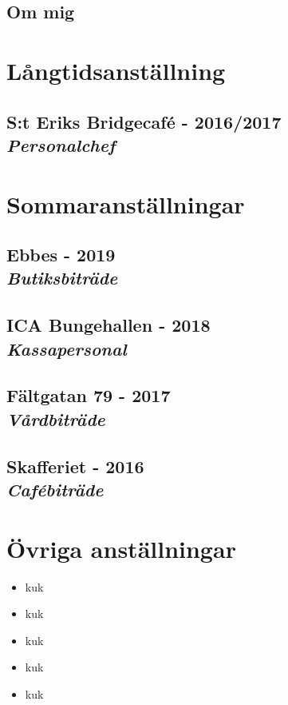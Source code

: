 \thispagestyle{firstpage}
\theoremstyle{normalhead}
\newtheorem{problem}{Problem}
\newtheorem{lemma}{Lemma}
\begin{multicols}{2}
  \begin{tcolorbox}[colback = babyblueeyes!25, boxsep=1pt,left=0pt,right=0pt,top=0pt,bottom=1pt]
\section*{Om mig}
\lipsum[2-2]
\end{tcolorbox}
\section*{Långtidsanställning}
\subsection*{S:t Eriks Bridgecafé - 2016/2017 \\
\normalfont\textit{Personalchef}}
\lipsum[2-2]
\section*{Sommaranställningar}
\subsection*{Ebbes - 2019\\
\normalfont\textit{Butiksbiträde}}
\lipsum[2-2]
\subsection*{ICA Bungehallen - 2018\\
\normalfont\textit{Kassapersonal}}
\lipsum[2-2]
\subsection*{Fältgatan 79 - 2017\\
\normalfont\textit{Vårdbiträde}}
\lipsum[2-2]
\subsection*{Skafferiet - 2016\\
\normalfont\textit{Cafébiträde}}
\lipsum[2-2]
\section*{Övriga anställningar}
\begin{itemize}[leftmargin=1cm]
  \setlength\itemsep{0.5em}
  \item kuk
  \item kuk
  \item kuk
  \item kuk
  \item kuk
\end{itemize}
\begin{tcolorbox}[colback = babyblueeyes!25, boxsep=1pt,left=0pt,right=0pt,top=0pt,bottom=1pt]

\end{tcolorbox}
\end{multicols}
